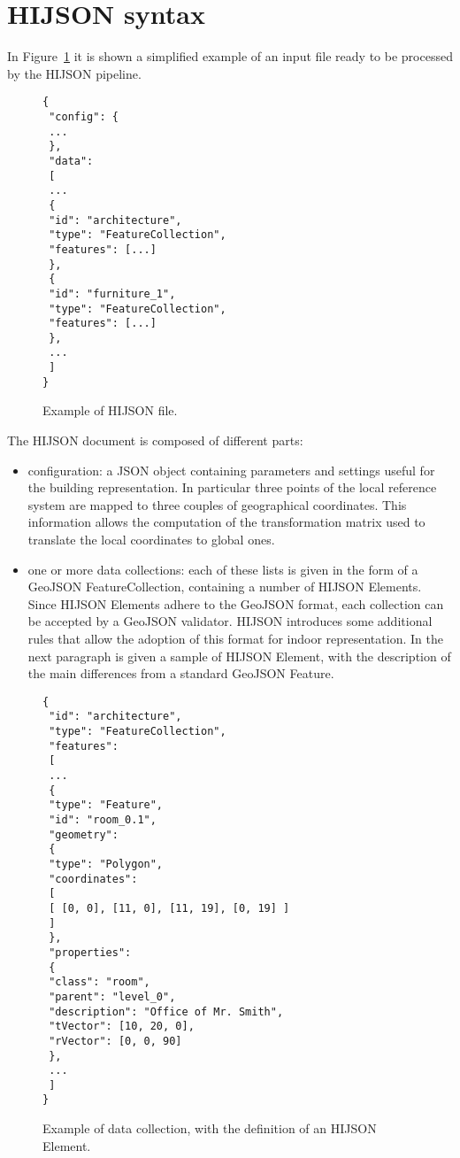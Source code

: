 
\section{HIJSON syntax}\label{hijson-syntax}

In Figure~\ref{fig:HIJSON} it is shown a simplified example of an input file ready to be processed by the HIJSON pipeline.

\begin{figure}[h]
\begin{verbatim}
{
 "config": {
 ...
 },
 "data": 
 [
 ...
 {
 "id": "architecture",
 "type": "FeatureCollection",
 "features": [...] 
 },
 {
 "id": "furniture_1",
 "type": "FeatureCollection",
 "features": [...] 
 },
 ...
 ]
}
\end{verbatim}
\caption{Example of HIJSON file.}
\label{fig:HIJSON}
\end{figure}

The HIJSON document is composed of different parts:

\begin{itemize}
\itemsep1pt\parskip0pt
\item 
 configuration: a JSON object containing parameters and settings useful
 for the building representation. In particular three points of the local
 reference system are mapped to three couples of geographical coordinates.
 This information allows the computation of the transformation matrix used to
 translate the local coordinates to global ones.
\item
 one or more data collections: each of these lists is given in the form of
 a GeoJSON FeatureCollection, containing a number of HIJSON Elements. Since
 HIJSON Elements adhere to the GeoJSON format, each collection can be
 accepted by a GeoJSON validator. HIJSON introduces some additional rules
 that allow the adoption of this format for indoor representation. In the
 next paragraph is given a sample of HIJSON Element, with the description of
 the main differences from a standard GeoJSON Feature. 
\end{itemize}


\begin{figure}[h]
\begin{verbatim}
{
 "id": "architecture",
 "type": "FeatureCollection",
 "features": 
 [
 ...
 {
 "type": "Feature",
 "id": "room_0.1",
 "geometry": 
 {
 "type": "Polygon",
 "coordinates": 
 [ 
 [ [0, 0], [11, 0], [11, 19], [0, 19] ]
 ]
 },
 "properties": 
 {
 "class": "room",
 "parent": "level_0",
 "description": "Office of Mr. Smith",
 "tVector": [10, 20, 0],
 "rVector": [0, 0, 90]
 },
 ...
 ]
}
\end{verbatim}
\caption{Example of data collection, with the definition of an HIJSON Element.}
\label{fig:dataCollection}
\end{figure}

